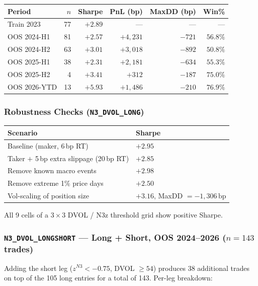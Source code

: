 \documentclass[11pt,a4paper]{article}
\newcommand{\code}[1]{\texttt{#1}}
\begin{document}
\begin{center}
\begin{tabular}{@{}lrrrrr@{}}
\toprule
\textbf{Period} & \textbf{$n$} & \textbf{Sharpe} & \textbf{PnL (bp)} & \textbf{MaxDD (bp)} & \textbf{Win\%} \\
\midrule
Train 2023 & 77 & $+2.89$ & --- & --- & --- \\
OOS 2024-H1 & 81 & $+2.57$ & $+4{,}231$ & $-721$ & $56.8\%$ \\
OOS 2024-H2 & 63 & $+3.01$ & $+3{,}018$ & $-892$ & $50.8\%$ \\
OOS 2025-H1 & 38 & $+2.31$ & $+2{,}181$ & $-634$ & $55.3\%$ \\
OOS 2025-H2 & 4 & $+3.41$ & $+312$ & $-187$ & $75.0\%$ \\
OOS 2026-YTD & 13 & $+5.93$ & $+1{,}486$ & $-210$ & $76.9\%$ \\
\bottomrule
\end{tabular}
\end{center}

\subsubsection*{Robustness Checks (\code{N3\_DVOL\_LONG})}

\begin{center}
\begin{tabular}{@{}ll@{}}
\toprule
\textbf{Scenario} & \textbf{Sharpe} \\
\midrule
Baseline (maker, 6\,bp RT) & $+2.95$ \\
Taker $+$ 5\,bp extra slippage (20\,bp RT) & $+2.85$ \\
Remove known macro events & $+2.98$ \\
Remove extreme 1\% price days & $+2.50$ \\
Vol-scaling of position size & $+3.16$, MaxDD $= -1{,}306\,\text{bp}$ \\
\bottomrule
\end{tabular}
\end{center}

All 9 cells of a $3 \times 3$ DVOL / N3z threshold grid show positive Sharpe.

\subsubsection*{\code{N3\_DVOL\_LONGSHORT} --- Long + Short, OOS 2024--2026 ($n = 143$ trades)}

Adding the short leg ($z^{N3} < -0.75$, DVOL $\geq 54$) produces 38 additional trades on top of the 105 long entries for a total of 143. Per-leg breakdown:
\end{document}
